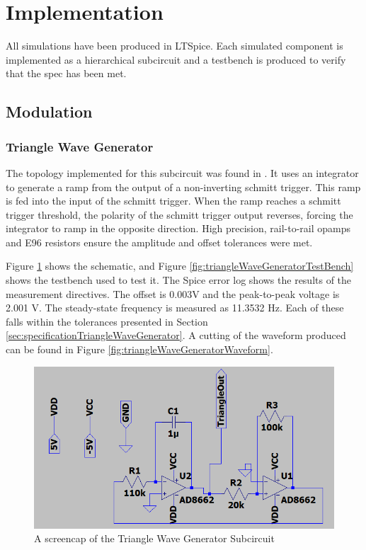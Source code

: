 \section{Implementation}
\label{sec:implementation}

All simulations have been produced in LTSpice.
Each simulated component is implemented as a hierarchical subcircuit and a testbench is produced to verify that the spec has been met. 

\subsection{Modulation}
\subsubsection{Triangle Wave Generator}
\label{sec:implementationTriangleWaveGenerator}
The topology implemented for this subcircuit was found in \cite{TriangleWaveTopology}. 
It uses an integrator to generate a ramp from the output of a non-inverting schmitt trigger. 
This ramp is fed into the input of the schmitt trigger. When the ramp reaches a schmitt trigger threshold, the polarity of the schmitt trigger output reverses, forcing the integrator to ramp in the opposite direction. 
High precision, rail-to-rail opamps and E96 resistors ensure the amplitude and offset tolerances were met. 

Figure \ref{fig:triangleWaveGeneratorSchematic} shows the schematic, and Figure \ref{fig:triangleWaveGeneratorTestBench} shows the testbench used to test it. 
The Spice error log shows the results of the measurement directives.
The offset is 0.003V and the peak-to-peak voltage is 2.001 V.
The steady-state frequency is measured as 11.3532 Hz.
Each of these falls within the tolerances presented in Section \ref{sec:specificationTriangleWaveGenerator}.
A cutting of the waveform produced can be found in Figure \ref{fig:triangleWaveGeneratorWaveform}. 


\begin{figure}[H]
    \centering 
    \includegraphics[width=\textwidth]{../Circuits/Images/TriangleWaveGenerator/schematic}
    \caption{A screencap of the Triangle Wave Generator Subcircuit}
    \label{fig:triangleWaveGeneratorSchematic}
\end{figure}

